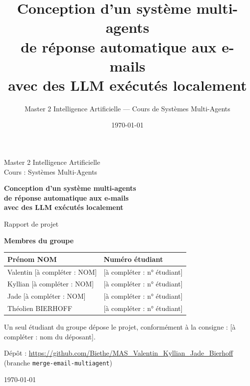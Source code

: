 \documentclass[11pt,a4paper]{article}
\title{\textbf{Conception d'un système multi-agents\\de réponse automatique aux e-mails\\avec des LLM exécutés localement}}
\author{Master 2 Intelligence Artificielle --- Cours de Systèmes Multi-Agents}
\date{\today}
\newcommand{\afaire}[1]{\textcolor{todo}{[à compléter : #1]}}
\newcommand{\code}[1]{\texttt{#1}}
\begin{document}
\begin{titlepage}
\centering
\vspace*{2cm}
{\large Master 2 Intelligence Artificielle\\Cours : Systèmes Multi-Agents\par}
\vspace{1.5cm}
{\LARGE\bfseries Conception d'un système multi-agents\\de réponse automatique aux e-mails\\avec des LLM exécutés localement\par}
\vspace{1.5cm}
{\large Rapport de projet\par}
\vspace{2cm}

\textbf{Membres du groupe}\\[0.8em]
\begin{tabular}{@{}ll@{}}
\toprule
\textbf{Prénom NOM} & \textbf{Numéro étudiant}\\
\midrule
Valentin \afaire{NOM} & \afaire{n° étudiant}\\
Kyllian \afaire{NOM} & \afaire{n° étudiant}\\
Jade \afaire{NOM} & \afaire{n° étudiant}\\
Théolien BIERHOFF & \afaire{n° étudiant}\\
\bottomrule
\end{tabular}

\vspace{0.8cm}
{\small Un seul étudiant du groupe dépose le projet, conformément à la consigne : \afaire{nom du déposant}.}

\vfill
{\small Dépôt : \url{https://github.com/Biethe/MAS_Valentin_Kyllian_Jade_Bierhoff}\\
(branche \code{merge-email-multiagent})\par}
\vspace{0.5cm}
{\small \today}
\end{titlepage}

\tableofcontents
\newpage











\end{document}
